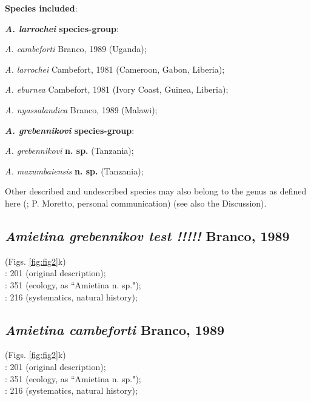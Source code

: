\documentclass[fleqn,10pt,lineno]{wlpeerj}
\begin{document}
\textbf{Species included}:

\smallskip \noindent \textbf{\textit{A. larrochei} species-group}:

\indent \textit{A. cambeforti} Branco, 1989 (Uganda);

\indent \textit{A. larrochei} Cambefort, 1981 (Cameroon, Gabon, Liberia);

\indent \textit{A. eburnea} Cambefort, 1981 (Ivory Coast, Guinea, Liberia);

\indent \textit{A. nyassalandica} Branco, 1989 (Malawi);

\smallskip \noindent \textbf{\textit{A. grebennikovi} species-group}:

\indent \textit{A. grebennikovi} \textbf{n. sp.} (Tanzania);

\indent \textit{A. mazumbaiensis} \textbf{n. sp.} (Tanzania);

\smallskip

Other described and undescribed species may also belong to the genus as defined here (\citealp{moretto2010onthophagus}; P. Moretto, personal communication) (see also the Discussion).





\subsection*{\textbf{\textit{Amietina grebennikov test !!!!!} Branco, 1989}}
(Figs. \ref{fig:fig2}k)\\
\cite{branco1988deux}: 201 (original description);\\
\cite{nummelin1989dung}: 351 (ecology, as ``{Amietina} n. sp.");\\
\cite{davis2008african}: 216 (systematics, natural history);\\








\subsection*{\textbf{\textit{Amietina cambeforti} Branco, 1989}}
(Figs. \ref{fig:fig2}k)\\
\cite{branco1988deux}: 201 (original description);\\
\cite{nummelin1989dung}: 351 (ecology, as ``{Amietina} n. sp.");\\
\cite{davis2008african}: 216 (systematics, natural history);\\
\end{document}
